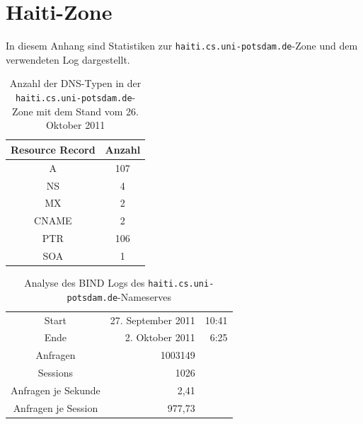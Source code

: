 \documentclass[a4paper, 12pt, BCOR10mm, DIV12, toc=bibliography, toc=listof, german]{scrbook}
\begin{document}
	
	
	


	\chapter{Haiti-Zone} %
	\label{cha:haiti}

	  In diesem Anhang sind Statistiken zur \texttt{haiti.cs.uni-potsdam.de}-Zone und dem verwendeten
		Log dargestellt.

		\begin{table}[h]
			\centering
			\begin{tabular}{|c|c|}\hline
				Resource Record & Anzahl \\\hline\hline
				A & 107 \\
				NS & 4 \\
				MX & 2 \\
				CNAME & 2 \\
				PTR & 106 \\
				SOA & 1 \\\hline
			\end{tabular}
			\caption{Anzahl der DNS-Typen in der \texttt{haiti.cs.uni-potsdam.de}-Zone mit dem Stand vom 26. Oktober 2011}
			\label{tab:rr-domain}
		\end{table}

		\begin{table}[h]
			\centering
			\begin{tabular}{|c|rr|}\hline
				Start & 27. September 2011 & 10:41 \\
				Ende & 2. Oktober 2011 & 6:25 \\
				Anfragen & 1003149 & \\
				Sessions & 1026 & \\
				Anfragen je Sekunde & 2,41 &\\
				Anfragen je Session & 977,73 &\\ \hline
			\end{tabular}
			\caption{Analyse des BIND Logs des \texttt{haiti.cs.uni-potsdam.de}-Nameserves}
			\label{tab:log}
		\end{table}
\end{document}
